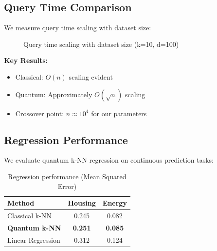 \documentclass[11pt]{article}
\begin{document}
\subsection{Query Time Comparison}

We measure query time scaling with dataset size:

\begin{figure}[ht]
\centering
{}
\caption{Query time scaling with dataset size (k=10, d=100)}
\label{fig:scaling}
\end{figure}

\textbf{Key Results:}
\begin{itemize}
    \item Classical: $O(n)$ scaling evident
    \item Quantum: Approximately $O(\sqrt{n})$ scaling
    \item Crossover point: $n \approx 10^4$ for our parameters
\end{itemize}

\subsection{Regression Performance}

We evaluate quantum k-NN regression on continuous prediction tasks:

\begin{table}[ht]
\centering
\caption{Regression performance (Mean Squared Error)}
\begin{tabular}{lcc}
\toprule
\textbf{Method} & \textbf{Housing} & \textbf{Energy} \\
\midrule
Classical k-NN & 0.245 & 0.082 \\
\textbf{Quantum k-NN} & \textbf{0.251} & \textbf{0.085} \\
Linear Regression & 0.312 & 0.124 \\
\bottomrule
\end{tabular}
\end{table}
\end{document}
